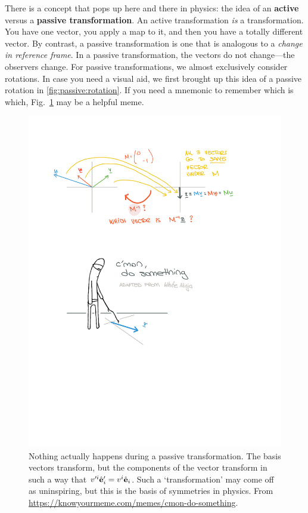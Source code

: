 \documentclass[12pt]{article}
\begin{document}
There is a concept that pops up here and there in physics: the idea of an \textbf{active} versus a \textbf{passive transformation}. An active transformation \emph{is} a transformation. You have one vector, you apply a map to it, and then you have a totally different vector. By contrast, a {passive} transformation is one that is analogous to a \emph{change in reference frame}. In a passive transformation, the vectors do not change---the observers change. For passive transformations, we almost exclusively consider rotations. In case you need a visual aid, we first brought up this idea of a passive rotation in \eqref{fig:passive:rotation}. If you need a mnemonic to remember which is which, Fig.~\ref{fig:do:something} may be a helpful meme.
\begin{figure}[tb]
    \centering
    \includegraphics[width=.5\textwidth]{figures/passivetransform_dosomething.pdf}
    \caption{
        Nothing actually happens during a passive transformation. The basis vectors transform, but the components of the vector transform in such a way that $v'^i\hat{\mathbf{e}}'_i = v^i\hat{\mathbf{e}}_i$. Such a `transformation' may come off as uninspiring, but this is the basis of symmetries in physics. 
        From \url{https://knowyourmeme.com/memes/cmon-do-something}.
    }
    \label{fig:do:something}
\end{figure}
\end{document}
